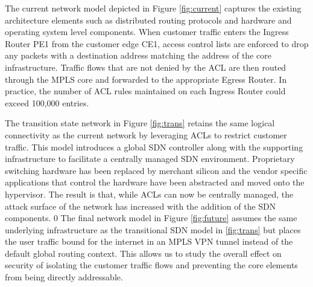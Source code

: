 The current network model depicted in Figure \ref{fig:current} captures the existing architecture elements such as distributed routing protocols and hardware and operating system level components. When customer traffic enters the Ingress Router PE1 from the customer edge CE1, access control lists are enforced to drop any packets with a destination address matching the address of the core infrastructure. Traffic flows that are not denied by the ACL are then routed through the MPLS core and forwarded to the appropriate Egress Router. In practice, the number of ACL rules maintained on each Ingress Router could exceed 100,000 entries.  

The transition state network in Figure \ref{fig:trans} retains the same logical connectivity as the current network by leveraging ACLs to restrict customer traffic. This model introduces a global SDN controller along with the supporting infrastructure to facilitate a centrally managed SDN environment. Proprietary switching hardware has been replaced by merchant silicon and the vendor specific applications that control the hardware have been abstracted and moved onto the hypervisor. The result is that, while ACLs can now be centrally managed, the attack surface of the network has increased with the addition of the SDN components.
0
The final network model in Figure \ref{fig:future} assumes the same underlying infrastructure as the transitional SDN model in \ref{fig:trans} but places the user traffic bound for the internet in an MPLS VPN tunnel\cite{Muthukrishnan_Malis}\cite{Rosen_Rekhter_2006} instead of the default global routing context. This allows us to study the overall effect on security of isolating the customer traffic flows and preventing the core elements from being directly addressable.  

